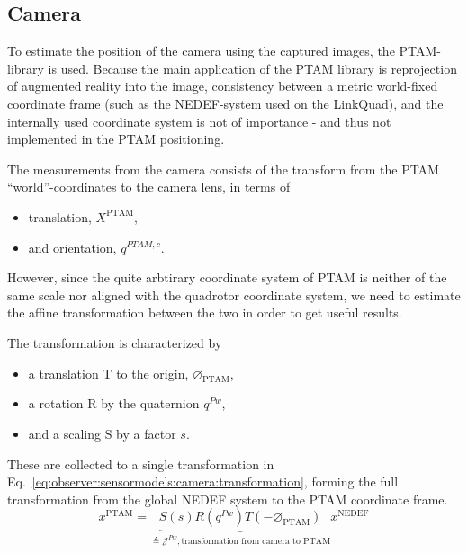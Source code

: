 \subsection{Camera}
\label{ssec:observer:sensormodels:camera}
    To estimate the position of the camera using the captured images,
    the PTAM-library is used.
    Because the main application of the PTAM library is reprojection of
    augmented reality into the image, consistency between a metric world-fixed
    coordinate frame (such as the NEDEF-system used on the LinkQuad), and the
    internally used coordinate system is not of importance - and thus not implemented in the PTAM positioning.

    The measurements from the camera consists of the transform from the PTAM ``world''-coordinates
    to the camera lens, in terms of
    \begin{itemize}
        \item translation, $X^{\text{PTAM}}$,
        \item and orientation, $q^{PTAM,c}$.
    \end{itemize}
    However, since the quite arbtirary\citep{klein07parallel} coordinate system
    of PTAM is neither of the same scale nor aligned with the quadrotor coordinate system,
    we need to estimate the affine transformation between the two in order to get useful results.

    The transformation is characterized by
    \begin{itemize}
        \item a translation T to the origin, $\varnothing_{\text{PTAM}}$,
        \item a rotation R by the quaternion $q^{Pw}$,
        \item and a scaling S by a factor $s$.
    \end{itemize}
    These are collected to a single transformation in Eq.~\ref{eq:observer:sensormodels:camera:transformation},
    forming the full transformation from the global NEDEF system to the
    PTAM coordinate frame.
    \begin{equation}
        \label{eq:observer:sensormodels:camera:transformation}
        x^{\text{PTAM}} = \underbrace{S(s) R(q^{Pw}) T(-\varnothing_{\text{PTAM}})}_{\triangleq \mathcal{J}^{Pw}, \text{transformation from camera to PTAM}}
         x^{\text{NEDEF}}
    \end{equation}

